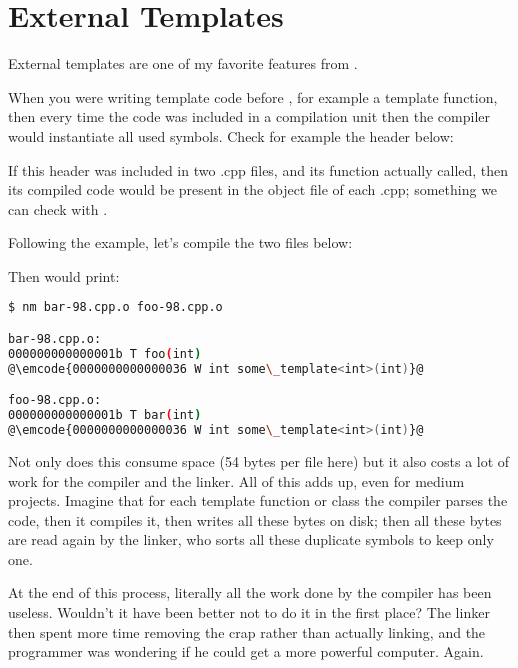 \section{External Templates}

External templates are one of my favorite features from .

When you were writing template code before , for example a
template function, then every time the code was included in a
compilation unit then the compiler would instantiate all used
symbols. Check for example the header below:



If this header was included in two .cpp files, and its function
actually called, then its compiled code would be present in the object
file of each .cpp; something we can check with .

Following the example, let's compile the two files below:





Then  would print:

\begin{lstlisting}[language=bash]
$ nm bar-98.cpp.o foo-98.cpp.o

bar-98.cpp.o:
000000000000001b T foo(int)
@\emcode{0000000000000036 W int some\_template<int>(int)}@

foo-98.cpp.o:
000000000000001b T bar(int)
@\emcode{0000000000000036 W int some\_template<int>(int)}@
\end{lstlisting}

Not only does this consume space (54 bytes per file here) but it also
costs a lot of work for the compiler and the linker. All of this adds
up, even for medium projects. Imagine that for each template function
or class the compiler parses the code, then it compiles it, then
writes all these bytes on disk; then all these bytes are read again by
the linker, who sorts all these duplicate symbols to keep only one.

At the end of this process, literally all the work done by the
compiler has been useless. Wouldn't it have been better not to do it
in the first place? The linker then spent more time removing the crap
rather than actually linking, and the programmer was wondering if he
could get a more powerful computer. Again.

